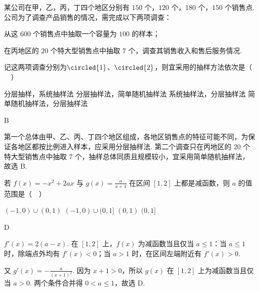 \begin{problem}
某公司在甲，乙，丙，丁四个地区分别有 \(150\text{ 个}\)，\(120\text{ 个}\)，\(180\text{ 个}\)，\(150\text{ 个}\)销售点. 公司为了调查产品销售的情况，需完成以下两项调查：

\begin{circlelist}
\item 从这 \(600\text{ 个}\)销售点中抽取一个容量为 \(100\) 的样本；
\item 在丙地区的 \(20\text{ 个}\)特大型销售点中抽取 \(7\) 个，调查其销售收入和售后服务情况.
\end{circlelist}

记这两项调查分别为\(\circled{1}\)、\(\circled{2}\)，则宜采用的抽样方法依次是（\(\quad\)）

\choices
    {分层抽样，系统抽样法}
    {分层抽样法，简单随机抽样法}
    {系统抽样法，分层抽样法}
    {简单随机抽样法，分层抽样法}
\end{problem}

\begin{answer}
B
\end{answer}

\begin{solution}
第一个总体由甲、乙、丙、丁四个地区组成，各地区销售点的特征可能不同，为保证各地区都按比例进入样本，应采用分层抽样法. 第二个调查只在丙地区的 20 个特大型销售点中抽取 7 个，抽样总体同质且规模较小，宜采用简单随机抽样法，故选 B.
\end{solution}

\begin{problem}
若 \( f(x) = -x^{2} + 2ax \) 与 \( g(x) = \frac{a}{x + 1} \) 在区间 \(\left[1,2\right]\) 上都是减函数，则 \( a \) 的值范围是（\(\quad\)）

\choices
    {\((-1,0)\cup (0,1)\)}
    {\((-1,0)\cup (0,1]\)}
    {\((0,1)\)}
    {\((0,1]\)}
\end{problem}

\begin{answer}
D
\end{answer}

\begin{solution}
\(f'(x)=2(a-x)\). 在 \([1,2]\) 上，\(f(x)\) 为减函数当且仅当 \(a\leqslant1\)：当 \(a\leqslant1\) 时，除端点外均有 \(f'(x)<0\)；当 \(a>1\) 时，在区间左端附近有 \(f'(x)>0\).

又 \(g'(x)=-\frac{a}{(x+1)^2}\). 因为 \(x+1>0\)，所以 \(g(x)\) 在 \([1,2]\) 上为减函数当且仅当 \(a>0\). 两个条件合并得 \(0<a\leqslant1\)，故选 D.
\end{solution}

